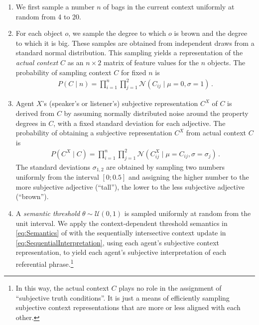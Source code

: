\documentclass[10pt,a4paper]{article}
\newcommand{\sem}[1]{\mbox{$[\![$#1$]\!]$}}
\begin{document}
\begin{enumerate}

\item We first sample a number $n$ of bags in the current context uniformly at
  random from 4 to 20.

\item For each object $o$, we sample the degree to which $o$ is brown and the
  degree to which it is big. These samples are obtained from independent draws
  from a standard normal distribution. This sampling yields a representation of
  the \emph{actual context} $C$ as an $n \times 2$ matrix of feature values for
  the $n$ objects. The probability of sampling context $C$ for fixed $n$ is
  \begin{align*}
    P(C \mid n) = \prod_{i=1}^n \prod_{j=1}^2 \mathcal{N}(C_{ij} \mid \mu = 0, \sigma = 1)\,.
  \end{align*}

\item Agent $X$'s (speaker's or listener's) subjective representation $C^X$ of
  $C$ is derived from $C$ by assuming normally distributed noise around the
  property degrees in $C$, with a fixed standard deviation for each adjective.
  The probability of obtaining a subjective representation $C^X$ from actual
  context $C$ is
  \begin{align*}
    P(C^X \mid C) = \prod_{i=1}^n \prod_{j=1}^2 \mathcal{N}(C_{ij}^X \mid \mu = C_{ij}, \sigma = \sigma_j)\,.
  \end{align*}
  The standard deviations $\sigma_{1,2}$ are obtained by sampling two numbers
  uniformly from the interval $[0;0.5]$ and assigning the higher number to the
  more subjective adjective (``tall''), the lower to the less subjective
  adjective (``brown'').

\item A \emph{semantic threshold} $\theta \sim \mathcal{U}(0,1)$ is sampled
  uniformly at random from the unit interval. We apply the context-dependent
  threshold semantics in \eqref{eq:Semantics} of  with
  the sequentially intersective context update in
  \eqref{eq:SequentialInterpretation}, using each agent's subjective context
  representation, to yield each agent's subjective interpretation of each
  referential phrase.\footnote{In this way, the actual context $C$ plays no role
    in the assignment of ``subjective truth conditions''. It is just a means of
    efficiently sampling subjective context representations that are more or
    less aligned with each other.}
 

\end{enumerate}
\end{document}
